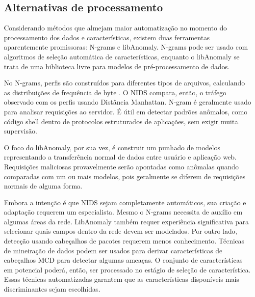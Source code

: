 \subsection{Alternativas de processamento}
Considerando métodos que almejam maior automatização no momento do processamento dos dados e características, existem
duas ferramentas aparentemente promissoras: N-grams e libAnomaly. N-grams pode ser usado com algoritmos de seleção
automática de características, enquanto o libAnomaly se trata de uma biblioteca livre para modelos de pré-processamento
de dados.
\par No N-grams, perfis são construídos para diferentes tipos de arquivos, calculando as distribuições de frequência
de byte \cite{zhuowei03}. O NIDS compara, então, o tráfego observado com os perfis usando Distância Manhattan. N-gram é geralmente
usado para analisar requisições ao servidor. É útil em detectar padrões anômalos, como código shell dentro de
protocolos estruturados de aplicações, sem exigir muita supervisão.
\par O foco do libAnomaly, por sua vez, é construir um punhado de modelos representando a transferência normal de
dados entre usuário e aplicação web. Requisições maliciosas provavelmente serão apontadas como anômalas quando
comparadas com um ou mais modelos, pois geralmente se diferem de requisições normais de alguma forma.
\par Embora a intenção é que NIDS sejam completamente automáticos, sua criação e adaptação requerem um especialista.
Mesmo o N-grams necessita de auxílio em algumas áreas da rede. LibAnomaly também requer experiência significativa
para selecionar quais campos dentro da rede devem ser modelados. Por outro lado, detecção usando cabeçalhos de
pacotes requerem menos conhecimento. Técnicas de mineiração de dados podem ser usados para derivar características de
cabeçalhos MCD para detectar algumas ameaças. O conjunto de características em potencial  poderá, então, ser processado no
estágio de seleção de característica. Essas técnicas automatizadas garantem que as características disponíveis mais discriminantes sejam
escolhidas.
